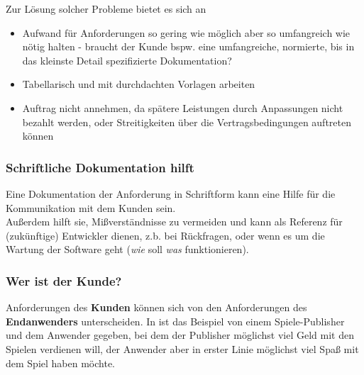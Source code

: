 \noindent
Zur Lösung solcher Probleme bietet es sich an

\begin{itemize}
    \item Aufwand für Anforderungen so gering wie möglich aber so umfangreich wie nötig halten - braucht der Kunde bspw. eine umfangreiche, normierte, bis in das kleinste Detail spezifizierte Dokumentation?
    \item Tabellarisch und mit durchdachten Vorlagen arbeiten
    \item Auftrag nicht annehmen, da spätere Leistungen durch Anpassungen nicht bezahlt werden, oder Streitigkeiten über die Vertragsbedingungen auftreten können
\end{itemize}


\subsubsection*{Schriftliche Dokumentation hilft}
Eine Dokumentation der Anforderung in Schriftform kann eine Hilfe für die Kommunikation mit dem Kunden sein.\\
Außerdem hilft sie, Mißverständnisse zu vermeiden und kann als Referenz für (zukünftige) Entwickler dienen, z.b. bei Rückfragen, oder wenn es um die Wartung der Software geht (\textit{wie} soll \textit{was} funktionieren).\\


\subsubsection*{Wer ist der Kunde?}
Anforderungen des \textbf{Kunden} können sich von den Anforderungen des \textbf{Endanwenders} unterscheiden.
In \cite[41]{Wed09} ist das Beispiel von einem Spiele-Publisher und dem Anwender gegeben, bei dem der Publisher möglichst viel Geld mit den Spielen verdienen will, der Anwender aber in erster Linie möglichst viel Spaß mit dem Spiel haben möchte.
